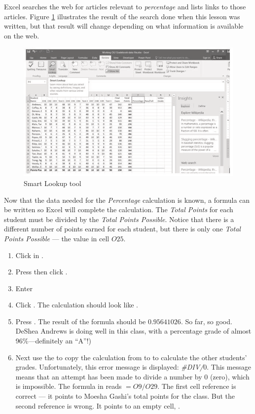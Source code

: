 Excel searches the web for articles relevant to \textit{percentage} and lists links to those articles. Figure \ref{03:fig06} illustrates the result of the search done when this lesson was written, but that result will change depending on what information is available on the web.

\begin{figure}[H]
	\centering
	\includegraphics[width=\maxwidth{.95\linewidth}]{gfx/ch03_fig06}
	\caption{Smart Lookup tool}
	\label{03:fig06}
\end{figure}

Now that the data needed for the \textit{Percentage} calculation is known, a formula can be written so Excel will complete the calculation. The \textit{Total Points} for each student must be divided by the \textit{Total Points Possible}. Notice that there is a different number of points earned for each student, but there is only one \textit{Total Points Possible} --- the value in cell $ O25 $.

\begin{enumerate}
	\item Click in .
	\item Press \fmtTyping{=} then click . 
	\item Enter \fmtTyping{/}
	\item Click . The calculation should look like .
	\item Press . The result of the formula should be $ 0.95641026 $. So far, so good. DeShea Andrews is doing well in this class, with a percentage grade of almost 96\%---definitely an ``A''!)
	\item Next use the  to copy the calculation from  to  to calculate the other students' grades. Unfortunately, this error message is displayed: \textit{\#DIV/$ 0 $}. This message means that an attempt has been made to divide a number by $ 0 $ (zero), which is impossible. The formula in  reads $ =O9/O29 $. The first cell reference is correct --- it points to Moesha Gashi's total points for the class. But the second reference is wrong. It points to an empty cell, .

\end{enumerate}

